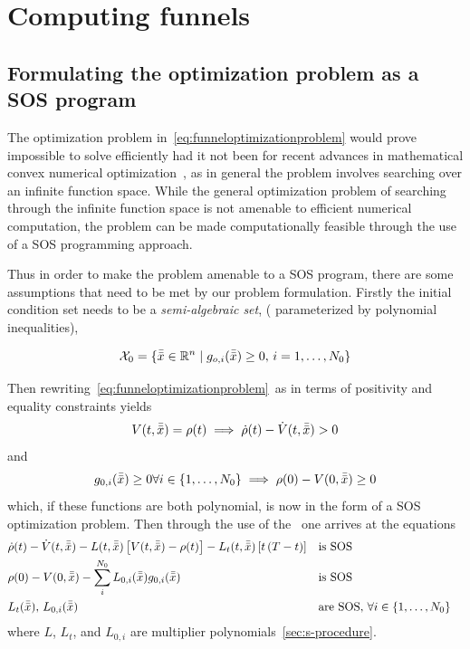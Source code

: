 \section{Computing funnels}

\subsection{Formulating the optimization problem as a SOS program}

The optimization problem in~\cref{eq:funneloptimizationproblem} would prove
impossible to solve efficiently had it not been for recent advances in
mathematical convex numerical
optimization~\cite[Parillo]{parilloStructuredSemidefinitePrograms}, as in
general the problem involves searching over an infinite function space. While
the general optimization problem of searching through the infinite function
space is not amenable to efficient numerical computation, the problem can be
made computationally feasible through the use of a \ac{SOS} programming
approach.

Thus in order to make the problem amenable to a \ac{SOS} program, there are some
assumptions that need to be met by our problem formulation. Firstly the initial
condition set needs to be a \textit{semi-algebraic set}, (\ie{} parameterized by
polynomial inequalities),

\begin{equation}
  \mathcal{X}_0 = \lbrace\bar{\bar{x}} \in \mathbb{R}^n \mid g_{o,i}(\bar{\bar{x}}) \geq 0, \, i = 1,\ldots,N_0\rbrace
\end{equation}

Then rewriting~\cref{eq:funneloptimizationproblem}~as in terms of positivity and
equality constraints yields
\begin{equation}
  V(t,\bar{\bar{x}}) = \rho(t) \implies \dot{\rho}(t) - \dot{V}(t,\bar{\bar{x}}) > 0
\end{equation}
and
\begin{equation}
  g_{0,i}(\bar{\bar{x}}) \geq 0 \forall i \in \lbrace1,\ldots,N_0\rbrace \implies \rho(0) - V(0,\bar{\bar{x}}) \geq 0
\end{equation}
which, if these functions are both polynomial, is now in the form of a \ac{SOS}
optimization problem. Then through the use of the~ one
arrives at the equations
\begin{align}
  &\dot{\rho}(t) - \dot{V}(t,\bar{\bar{x}}) - L(t,\bar{\bar{x}})\left[ V(t,\bar{\bar{x}}) - \rho(t) \right] - L_{t}(t,\bar{\bar{x}})\left[ t\left( T - t \right) \right]  && \text{is SOS}& \label{eq:sufficient-conditions}\\
  & \rho(0) - V(0,\bar{\bar{x}}) - \sum_{i}^{N_{0}} L_{0,i}(\bar{\bar{x}})g_{0,i}(\bar{\bar{x}}) && \text{is SOS}& \\
  & L_{t}(\bar{\bar{x}}), \, L_{0,i}(\bar{\bar{x}}) \; &&\text{are SOS}, \, \forall i \in \lbrace1,\ldots,N_{0}\rbrace \label{eq:sufficient-conditions3} \\
\end{align} 
where \(L\), \(L_{t}\), and \(L_{0,i}\) are multiplier
polynomials~\cref{sec:s-procedure}.


